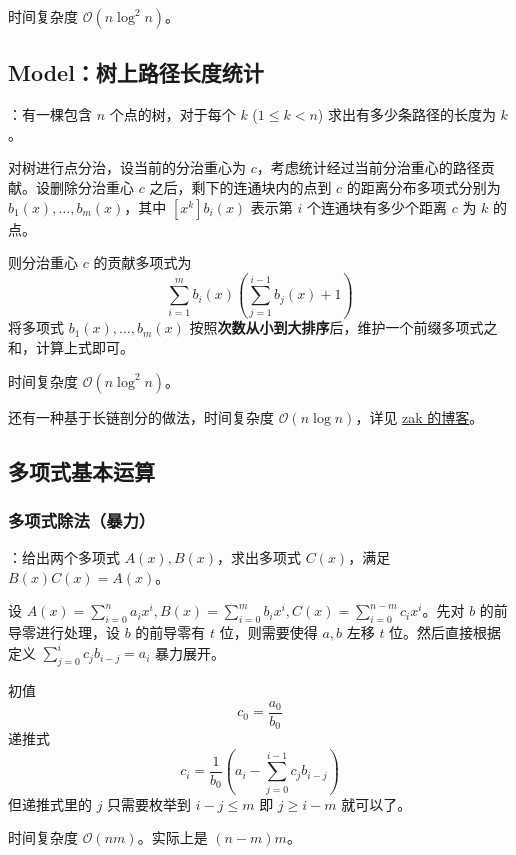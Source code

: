 时间复杂度 $\mathcal{O}(n \log^2 n)$。

\subsection{Model：树上路径长度统计}

：有一棵包含 $n$ 个点的树，对于每个 $k$ ($1 \leq k < n$) 求出有多少条路径的长度为 $k$。

对树进行点分治，设当前的分治重心为 $c$，考虑统计经过当前分治重心的路径贡献。设删除分治重心 $c$ 之后，剩下的连通块内的点到 $c$ 的距离分布多项式分别为 $b_1(x), \dots, b_m(x)$，其中 $[x^k]b_i(x)$ 表示第 $i$ 个连通块有多少个距离 $c$ 为 $k$ 的点。

则分治重心 $c$ 的贡献多项式为
\[
\sum_{i = 1}^{m} b_i(x) \left( \sum_{j = 1}^{i - 1}b_j(x) + 1 \right)
\]
将多项式 $b_1(x), \dots, b_m(x)$ 按照\textbf{次数从小到大排序}后，维护一个前缀多项式之和，计算上式即可。

时间复杂度 $\mathcal{O}(n \log^2 n)$。

\begin{quoteblock}
还有一种基于长链剖分的做法，时间复杂度 $\mathcal{O}(n \log n)$，详见 \href{https://www.cnblogs.com/zkyJuruo/p/18809573}{zak 的博客}。
\end{quoteblock}

\subsection{多项式基本运算}

\subsubsection{多项式除法（暴力）}

：给出两个多项式 $A(x), B(x)$，求出多项式 $C(x)$，满足 $B(x)C(x) = A(x)$。

设 $A(x) = \sum_{i = 0}^n a_ix^i, B(x) = \sum_{i = 0}^m b_ix^i, C(x) = \sum_{i = 0}^{n - m}c_ix^i$。先对 $b$ 的前导零进行处理，设 $b$ 的前导零有 $t$ 位，则需要使得 $a, b$ 左移 $t$ 位。然后直接根据定义 $\sum_{j = 0}^ic_jb_{i - j} = a_i$ 暴力展开。

初值
\[
c_0 = \frac{a_0}{b_0}
\]
递推式
\[
c_i = \frac{1}{b_0}\left( a_i - \sum_{j = 0}^{i - 1}c_jb_{i - j} \right)
\]
但递推式里的 $j$ 只需要枚举到 $i - j \leq m$ 即 $j \geq i - m$ 就可以了。

时间复杂度 $\mathcal{O}(nm)$。实际上是 $(n - m)m$。

